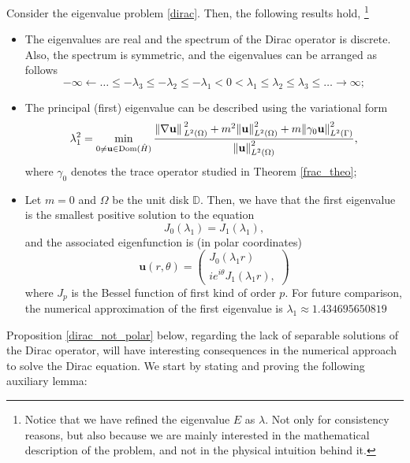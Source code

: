 \begin{proposition}\label{dirac_properties}
    Consider the eigenvalue problem \eqref{dirac}. Then, the following results hold, \footnote{Notice that we have refined the eigenvalue \(E\) as \(\lambda\). Not only for consistency reasons, but also because we are mainly interested in the mathematical description of the problem, and not in the physical intuition behind it.}
    \begin{itemize}
        \item The eigenvalues are real and the spectrum of the Dirac operator is discrete. Also, the spectrum is symmetric, and the eigenvalues can be arranged as follows
        \[
        -\infty \leftarrow \dots \leq -\lambda_3 \leq -\lambda_2 \leq -\lambda_1 < 0 < \lambda_1 \leq \lambda_2 \leq \lambda_3 \leq \dots \rightarrow \infty;
        \]
        \item The principal (first) eigenvalue can be described using the variational form
        \[
        \lambda_1^2 = \min_{0 \neq \mathbf{u} \in \operatorname{Dom}(\hat{H})}\frac{\norm*{\nabla \mathbf{u}}_{L^2(\Omega)}^2 + m^2 \norm{\mathbf{u}}_{L^2(\Omega)}^2 + m \norm{\gamma_0 \mathbf{u}}_{L^2(\Gamma)}^2}{\norm{\mathbf{u}}_{L^2(\Omega)}^2},
        \]
        where \(\gamma_0\) denotes the trace operator studied in Theorem \ref{frac_theo};
        \item Let \(m=0\) and \(\Omega\) be the unit disk \(\mathbb{D}\). Then, we have that the first eigenvalue is the smallest positive solution to the equation
        \[
        J_0(\lambda_1) = J_1(\lambda_1),
        \]
        and the associated eigenfunction is (in polar coordinates)
        \[
            \mathbf{u}(r, \theta) = \begin{pmatrix}
            J_0(\lambda_1 r)\\
            i e^{i \theta}J_1(\lambda_1 r),
        \end{pmatrix}
        \]
        where \(J_p\) is the Bessel function of first kind of order \(p\).
        For future comparison, the numerical approximation of the first eigenvalue is \(\lambda_1 \approx 1.434695650819\)
    \end{itemize}
\end{proposition}

Proposition \ref{dirac_not_polar} below, regarding the lack of separable solutions of the Dirac operator, will have interesting consequences in the numerical approach to solve the Dirac equation. We start by stating and proving the following auxiliary lemma:

